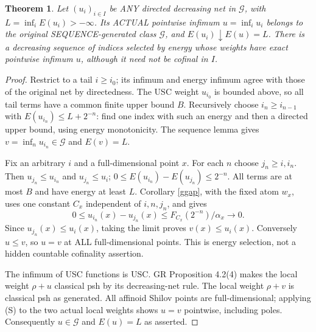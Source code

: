 \documentclass[11pt]{article}
\newcommand{\G}{\mathcal G}
\newtheorem{theorem}{Theorem}
\theoremstyle{remark}\newtheorem{remark}[theorem]{Remark}
\begin{document}
\begin{theorem}\label{net}
Let $(u_i)_{i\in I}$ be ANY directed decreasing net in $\G$,
with $L=\inf_iE(u_i)>-\infty$. Its ACTUAL pointwise infimum
$u=\inf_i u_i$ belongs to the original SEQUENCE-generated class
$\G$, and $E(u_i)\downarrow E(u)=L$. There is a decreasing
sequence of indices selected by energy whose weights have exact
pointwise infimum $u$, although it need not be cofinal in $I$.
\end{theorem}
\begin{proof}
Restrict to a tail $i\ge i_0$; its infimum and energy infimum agree
with those of the original net by directedness. The USC weight
$u_{i_0}$ is bounded above, so all tail terms have a common finite
upper bound $B$. Recursively choose $i_n\ge i_{n-1}$ with
$E(u_{i_n})\le L+2^{-n}$: find one index with such an energy and
then a directed upper bound, using energy monotonicity.
The sequence lemma gives
$v=\inf_nu_{i_n}\in\G$ and $E(v)=L$.

Fix an arbitrary $i$ and a full-dimensional point $x$. For each $n$
choose $j_n\ge i,i_n$. Then
$u_{j_n}\le u_{i_n}$ and $u_{j_n}\le u_i$;
$0\le E(u_{i_n})-E(u_{j_n})\le2^{-n}$.
All terms are at most $B$ and have energy at least $L$. Corollary
\ref{ggap}, with the fixed atom $w_x$, uses one constant $C_x$
independent of $i,n,j_n$, and gives
\[
0\le u_{i_n}(x)-u_{j_n}(x)
\le F_{C_x}(2^{-n})/\alpha_x\longrightarrow0.
\]
Since $u_{j_n}(x)\le u_i(x)$, taking the limit proves
$v(x)\le u_i(x)$. Conversely $u\le v$, so $u=v$ at ALL
full-dimensional points. This is energy selection, not a hidden
countable cofinality assertion.

The infimum of USC functions is USC. GR Proposition 4.2(4) makes
the local weight $\rho+u$ classical psh by its decreasing-net rule.
The local weight $\rho+v$ is classical psh as generated. All
affinoid Shilov points are full-dimensional; applying (S) to the two
actual local weights shows $u=v$ pointwise, including poles.
Consequently $u\in\G$ and $E(u)=L$ as asserted.
\end{proof}
\end{document}
